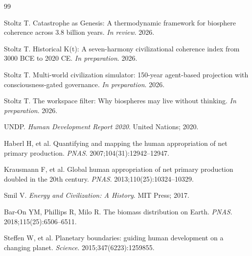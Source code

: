 \documentclass[10pt,letterpaper]{article}
\begin{document}
\begin{thebibliography}{99}

Stoltz T. Catastrophe as Genesis: A thermodynamic framework for biosphere
coherence across 3.8 billion years. \emph{In review}. 2026.

Stoltz T. Historical K(t): A seven-harmony civilizational coherence index
from 3000 BCE to 2020 CE. \emph{In preparation}. 2026.

Stoltz T. Multi-world civilization simulator: 150-year agent-based
projection with consciousness-gated governance. \emph{In preparation}. 2026.

Stoltz T. The workspace filter: Why biospheres may live without
thinking. \emph{In preparation}. 2026.

UNDP. \emph{Human Development Report 2020}. United Nations; 2020.

Haberl H, et al. Quantifying and mapping the human appropriation of net
primary production. \emph{PNAS}. 2007;104(31):12942--12947.

Krausmann F, et al. Global human appropriation of net primary production
doubled in the 20th century. \emph{PNAS}. 2013;110(25):10324--10329.

Smil V. \emph{Energy and Civilization: A History}. MIT Press; 2017.

Bar-On YM, Phillips R, Milo R. The biomass distribution on Earth.
\emph{PNAS}. 2018;115(25):6506--6511.

Steffen W, et al. Planetary boundaries: guiding human development on a
changing planet. \emph{Science}. 2015;347(6223):1259855.

\end{thebibliography}
\end{document}
